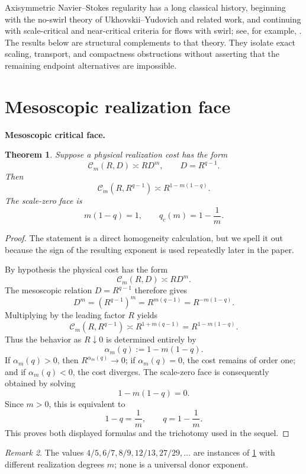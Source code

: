 \documentclass[11pt]{article}
\newtheorem{theorem}{Theorem}[section]
\theoremstyle{definition}\newtheorem{definition}[theorem]{Definition}
\theoremstyle{remark}\newtheorem{remark}[theorem]{Remark}
\begin{document}
Axisymmetric Navier--Stokes regularity has a long classical history, beginning with the no-swirl theory of Ukhovskii--Yudovich and related work, and continuing with scale-critical and near-critical criteria for flows with swirl; see, for example, \cite{UkhovskiiYudovich1968,ChenStrainTsaiYau2008,ChenStrainTsaiYau2009,LeiZhang2011,LeiNavasZhang2016,Wei2016,LeiZhang2017,Pan2016}.  The results below are structural complements to that theory.  They isolate exact scaling, transport, and compactness obstructions without asserting that the remaining endpoint alternatives are impossible.

\section{Mesoscopic realization face}
\medskip
\noindent\textbf{Mesoscopic critical face.}
\begin{theorem}\label{thm:face}
Suppose a physical realization cost has the form
\[
\mathcal C_m(R,D)\asymp R D^m,\qquad D=R^{q-1}.
\]
Then
\[
\boxed{\mathcal C_m(R,R^{q-1})\asymp R^{1-m(1-q)}.}
\]
The scale-zero face is
\[
\boxed{m(1-q)=1,\qquad q_c(m)=1-\frac1m.}
\]
\end{theorem}
\begin{proof}
The statement is a direct homogeneity calculation, but we spell it out because the sign of the resulting exponent is used repeatedly later in the paper.

By hypothesis the physical cost has the form
\[
 \mathcal C_m(R,D)\asymp R D^m.
\]
The mesoscopic relation $D=R^{q-1}$ therefore gives
\[
 D^m=(R^{q-1})^m=R^{m(q-1)}=R^{-m(1-q)}.
\]
Multiplying by the leading factor $R$ yields
\[
 \mathcal C_m(R,R^{q-1})
 \asymp R^{1+m(q-1)}
 =R^{1-m(1-q)}.
\]
Thus the behavior as $R\downarrow0$ is determined entirely by
\[
 \alpha_m(q):=1-m(1-q).
\]
If $\alpha_m(q)>0$, then $R^{\alpha_m(q)}\to0$; if $\alpha_m(q)=0$, the cost remains of order one; and if $\alpha_m(q)<0$, the cost diverges.  The scale-zero face is consequently obtained by solving
\[
 1-m(1-q)=0.
\]
Since $m>0$, this is equivalent to
\[
 1-q=\frac1m,
 \qquad
 q=1-\frac1m.
\]
This proves both displayed formulas and the trichotomy used in the sequel.
\end{proof}
\begin{remark}
The values $4/5,6/7,8/9,12/13,27/29,\ldots$ are instances of \cref{thm:face} with different realization degrees $m$; none is a universal donor exponent.
\end{remark}
\end{document}
